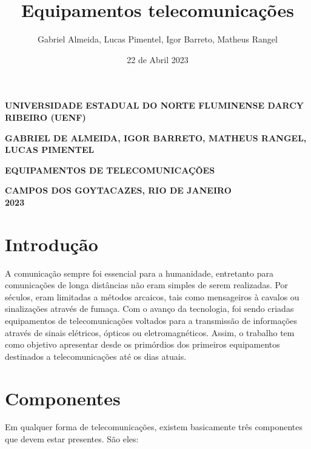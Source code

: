 \documentclass[12pt,a4, oneside, brazil]{article}
\title{Equipamentos telecomunicações}
\author{Gabriel Almeida, Lucas Pimentel, Igor Barreto, Matheus Rangel}
\date{22 de Abril 2023}
\begin{document}
	
	\thispagestyle{empty}
	\begin{center}
		
		\Large \textbf{UNIVERSIDADE ESTADUAL DO NORTE FLUMINENSE DARCY RIBEIRO (UENF)}
		
		\vspace{3cm}
		
		\Large \textbf{GABRIEL DE ALMEIDA, IGOR BARRETO, MATHEUS RANGEL, LUCAS PIMENTEL}
	
		\vspace{5cm}
		
		\Large \textbf{\textbf{EQUIPAMENTOS DE TELECOMUNICAÇÕES}}
	
		
		
		
	\end{center}

	\begin{center}
		\vspace{10cm}
		\textbf{CAMPOS DOS GOYTACAZES, RIO DE JANEIRO \\ 2023}
	\end{center}

\newpage
	
	
	\nocite{Burgt2003} 	\nocite{Canaltech2022-qp} 	\nocite{Forouzan2006} 	\nocite{McNamara2007-lh} 	\nocite{Rezgui2021}
	\nocite{Viana2020} 	\nocite{noauthor_2021-xh}
	\nocite{Souza2021}
	\nocite{TomSeymour2011}
	\nocite{Marketing_Alctel_Telecom2018-ca}
	\nocite{BBC_News_Brasil2021-lf}
	\nocite{Paranhos2013-ui}
	\nocite{noauthor_undated-ka}
	\nocite{noauthor_2005-ns}
	 
	\section{Introdução}
	A comunicação sempre foi essencial para a humanidade, entretanto para comunicações de longa distâncias não eram simples de serem realizadas. Por séculos, eram limitadas a métodos arcaicos, tais como mensageiros à cavalos ou sinalizações através de fumaça. Com o avanço da tecnologia, foi sendo criadas equipamentos de telecomunicações voltados para a transmissão de informações através de sinais elétricos, ópticos ou eletromagnéticos. Assim, o trabalho tem como objetivo apresentar desde os primórdios dos primeiros equipamentos destinados a telecomunicações até os dias atuais.
	
	\section{Componentes}
	Em qualquer forma de telecomunicações, existem basicamente três componentes que devem estar presentes. São eles:
	
\end{document}
